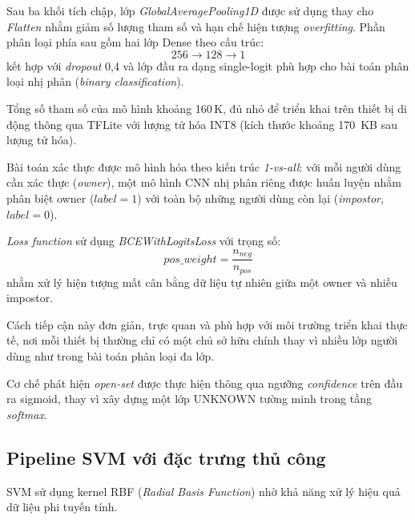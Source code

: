 \documentclass[../DoAn.tex]{subfiles}
\begin{document}
    Sau ba khối tích chập, lớp \textit{GlobalAveragePooling1D} được sử dụng thay cho \textit{Flatten} nhằm giảm số lượng tham số và hạn chế hiện tượng \textit{overfitting}. Phần phân loại phía sau gồm hai lớp Dense theo cấu trúc:
    \[
    256 \rightarrow 128 \rightarrow 1
    \]
    kết hợp với \textit{dropout} 0,4 và lớp đầu ra dạng single-logit phù hợp cho bài toán phân loại nhị phân (\textit{binary classification}).
    
    Tổng số tham số của mô hình khoảng 160\,K, đủ nhỏ để triển khai trên thiết bị di động thông qua TFLite với lượng tử hóa INT8 (kích thước khoảng 170~KB sau lượng tử hóa).
    
    Bài toán xác thực được mô hình hóa theo kiến trúc \textit{1-vs-all}: với mỗi người dùng cần xác thực (\textit{owner}), một mô hình CNN nhị phân riêng được huấn luyện nhằm phân biệt owner ($label = 1$) với toàn bộ những người dùng còn lại (\textit{impostor}, $label = 0$).
    
    \textit{Loss function} sử dụng \textit{BCEWithLogitsLoss} với trọng số:
    \[
    pos\_weight = \frac{n_{neg}}{n_{pos}}
    \]
    nhằm xử lý hiện tượng mất cân bằng dữ liệu tự nhiên giữa một owner và nhiều impostor.
    
    Cách tiếp cận này đơn giản, trực quan và phù hợp với môi trường triển khai thực tế, nơi mỗi thiết bị thường chỉ có một chủ sở hữu chính thay vì nhiều lớp người dùng như trong bài toán phân loại đa lớp.
    
    Cơ chế phát hiện \textit{open-set} được thực hiện thông qua ngưỡng \textit{confidence} trên đầu ra sigmoid, thay vì xây dựng một lớp UNKNOWN tường minh trong tầng \textit{softmax}.

    \subsection{Pipeline SVM với đặc trưng thủ công}

    SVM sử dụng kernel RBF (\textit{Radial Basis Function}) nhờ khả năng xử lý hiệu quả dữ liệu phi tuyến tính.
    
\end{document}
